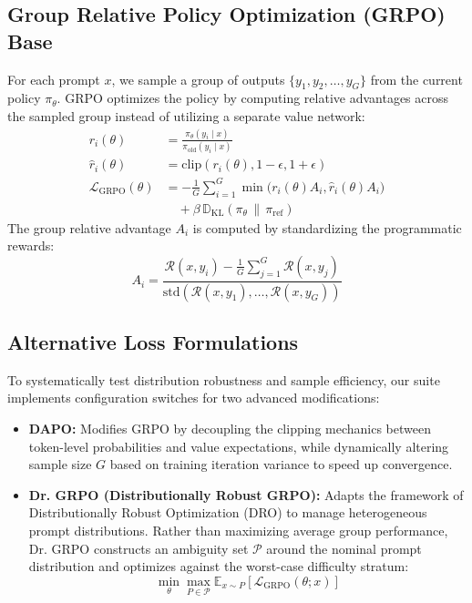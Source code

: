 \documentclass{article}
\theoremstyle{plain}
\theoremstyle{definition}
\theoremstyle{remark}
\begin{document}
\subsection{Group Relative Policy Optimization (GRPO) Base}
For each prompt $x$, we sample a group of outputs $\{y_1, y_2, \dots, y_G\}$ from the current policy $\pi_\theta$. GRPO optimizes the policy by computing relative advantages across the sampled group instead of utilizing a separate value network:
\begin{align}
r_i(\theta)
&=
\frac{\pi_\theta(y_i \mid x)}
{\pi_{\text{old}}(y_i \mid x)}
\\
\hat{r}_i(\theta)
&=
\mathrm{clip}\!\left(
r_i(\theta),
1-\epsilon,
1+\epsilon
\right)
\\
\mathcal{L}_{\text{GRPO}}(\theta)
&=
-\frac{1}{G}
\sum_{i=1}^G
\min \Big(
r_i(\theta) A_i,
\hat{r}_i(\theta) A_i
\Big)
\\
&\quad
+ \beta \,
\mathbb{D}_{\mathrm{KL}}\!\left(
\pi_\theta \,\|\, \pi_{\text{ref}}
\right)
\end{align}
The group relative advantage $A_i$ is computed by standardizing the programmatic rewards:
$$A_i = \frac{\mathcal{R}(x, y_i) - \frac{1}{G}\sum_{j=1}^G \mathcal{R}(x, y_j)}{\text{std}(\mathcal{R}(x, y_1), \dots, \mathcal{R}(x, y_G))}$$ 

\subsection{Alternative Loss Formulations}
To systematically test distribution robustness and sample efficiency, our suite implements configuration switches for two advanced modifications:
\begin{itemize}
\item \textbf{DAPO:} Modifies GRPO by decoupling the clipping mechanics between token-level probabilities and value expectations, while dynamically altering sample size $G$ based on training iteration variance to speed up convergence. 
\item \textbf{Dr. GRPO (Distributionally Robust GRPO):} Adapts the framework of Distributionally Robust Optimization (DRO) to manage heterogeneous prompt distributions. Rather than maximizing average group performance, Dr. GRPO constructs an ambiguity set $\mathcal{P}$ around the nominal prompt distribution and optimizes against the worst-case difficulty stratum:
$$\min_\theta \max_{P \in \mathcal{P}} \mathbb{E}_{x \sim P} \left[ \mathcal{L}_{\text{GRPO}}(\theta; x) \right]$$ 
\end{itemize}
\end{document}
